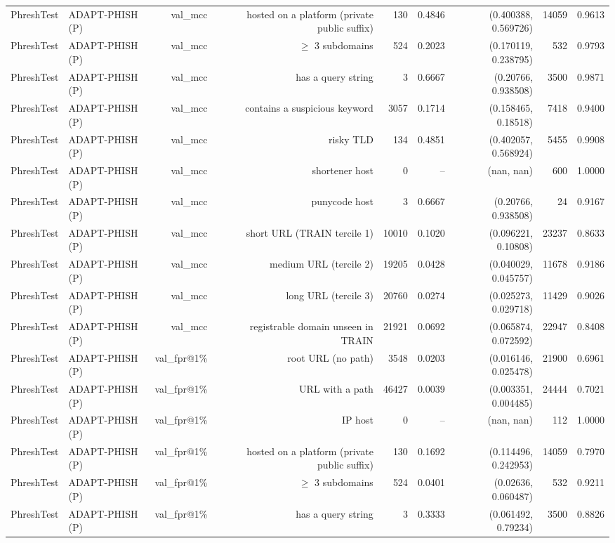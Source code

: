\begin{table}[t]
\begin{tabular}{llrrrrrrr}
PhreshTest & ADAPT-PHISH (P) & val\_mcc & hosted on a platform (private public suffix) & 130 & 0.4846 & (0.400388, 0.569726) & 14059 & 0.9613 \\
PhreshTest & ADAPT-PHISH (P) & val\_mcc & $\geq$ 3 subdomains & 524 & 0.2023 & (0.170119, 0.238795) & 532 & 0.9793 \\
PhreshTest & ADAPT-PHISH (P) & val\_mcc & has a query string & 3 & 0.6667 & (0.20766, 0.938508) & 3500 & 0.9871 \\
PhreshTest & ADAPT-PHISH (P) & val\_mcc & contains a suspicious keyword & 3057 & 0.1714 & (0.158465, 0.18518) & 7418 & 0.9400 \\
PhreshTest & ADAPT-PHISH (P) & val\_mcc & risky TLD & 134 & 0.4851 & (0.402057, 0.568924) & 5455 & 0.9908 \\
PhreshTest & ADAPT-PHISH (P) & val\_mcc & shortener host & 0 & -- & (nan, nan) & 600 & 1.0000 \\
PhreshTest & ADAPT-PHISH (P) & val\_mcc & punycode host & 3 & 0.6667 & (0.20766, 0.938508) & 24 & 0.9167 \\
PhreshTest & ADAPT-PHISH (P) & val\_mcc & short URL (TRAIN tercile 1) & 10010 & 0.1020 & (0.096221, 0.10808) & 23237 & 0.8633 \\
PhreshTest & ADAPT-PHISH (P) & val\_mcc & medium URL (tercile 2) & 19205 & 0.0428 & (0.040029, 0.045757) & 11678 & 0.9186 \\
PhreshTest & ADAPT-PHISH (P) & val\_mcc & long URL (tercile 3) & 20760 & 0.0274 & (0.025273, 0.029718) & 11429 & 0.9026 \\
PhreshTest & ADAPT-PHISH (P) & val\_mcc & registrable domain unseen in TRAIN & 21921 & 0.0692 & (0.065874, 0.072592) & 22947 & 0.8408 \\
PhreshTest & ADAPT-PHISH (P) & val\_fpr@1\% & root URL (no path) & 3548 & 0.0203 & (0.016146, 0.025478) & 21900 & 0.6961 \\
PhreshTest & ADAPT-PHISH (P) & val\_fpr@1\% & URL with a path & 46427 & 0.0039 & (0.003351, 0.004485) & 24444 & 0.7021 \\
PhreshTest & ADAPT-PHISH (P) & val\_fpr@1\% & IP host & 0 & -- & (nan, nan) & 112 & 1.0000 \\
PhreshTest & ADAPT-PHISH (P) & val\_fpr@1\% & hosted on a platform (private public suffix) & 130 & 0.1692 & (0.114496, 0.242953) & 14059 & 0.7970 \\
PhreshTest & ADAPT-PHISH (P) & val\_fpr@1\% & $\geq$ 3 subdomains & 524 & 0.0401 & (0.02636, 0.060487) & 532 & 0.9211 \\
PhreshTest & ADAPT-PHISH (P) & val\_fpr@1\% & has a query string & 3 & 0.3333 & (0.061492, 0.79234) & 3500 & 0.8826 \\

\end{tabular}
\end{table}
